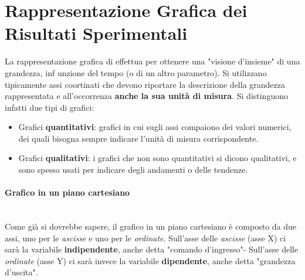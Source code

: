 \documentclass[a4paper,11pt]{report}
\begin{document}
\section{Rappresentazione Grafica dei Risultati Sperimentali}
La rappresentazione grafica di effettua per ottenere una "visione d'insieme" di una grandezza, inf unzione del tempo (o di un altro parametro). Si utilizzano tipicamente assi coortinati che devono riportare la descrizione della grandezza rappresentata e all'occorrenza \textbf{anche la sua unità di misura}.
Si distinguono infatti due tipi di grafici:
\begin{itemize}
  \item Grafici \textbf{quantitativi}: grafici in cui sugli assi compaiono dei valori numerici, dei quali bisogna sempre indicare l'unità di misura corrispondente.
  \item Grafici \textbf{qualitativi}: i grafici che non sono quantitativi si dicono qualitativi, e sono spesso usati per indicare degli andamenti o delle tendenze.
\end{itemize}
\paragraph{Grafico in un piano cartesiano}~\\
Come già si dovrebbe sapere, il grafico in un piano cartesiano è composto da due assi, uno per le \textit{ascisse} e uno per le \textit{ordinate}. Sull'asse delle \textit{ascisse} (asse X) ci sarà la variabile \textbf{indipendente}, anche detta "comando d'ingresso"- Sull'asse delle \textit{ordinate} (asse Y) ci sarà invece la variabile \textbf{dipendente}, anche detta "grandezza d'uscita".
\end{document}
